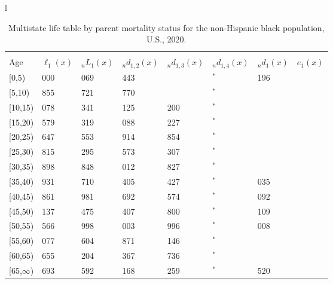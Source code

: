 \documentclass[
]{article}
\begin{document}
\begin{table}
\caption{\label{tab:table-nhblack}Multistate life table by parent mortality status for the non-Hispanic black population, U.S., 2020.}

\centering
\fontsize{9}{11}\selectfont
\begin{tabular}[t]{l}
\hline
\begin{tabular}{>{\raggedright\arraybackslash}p{.45in}>{\raggedleft\arraybackslash}p{.65in}>{\raggedleft\arraybackslash}p{.65in}>{\raggedleft\arraybackslash}p{.65in}>{\raggedleft\arraybackslash}p{.65in}>{\raggedleft\arraybackslash}p{.65in}>{\raggedleft\arraybackslash}p{.65in}>{\raggedleft\arraybackslash}p{.65in}}
\toprule
\multicolumn{1}{c}{ } & \multicolumn{7}{c}{(1) Lost neither} \\
\cmidrule(l{3pt}r{3pt}){2-8}
Age & $\ell_{1}(x)$ & ${}_nL_{1}(x)$ & ${}_nd_{1,2}(x)$ & ${}_nd_{1,3}(x)$ & ${}_nd_{1,4}(x)$ & ${}_nd_{1}(x)$ & $e_{1}(x)$\\
\midrule
{}[0,5) & 100 000 & 490 069 & 1 443 & 440 & 67$^{*}$ & 1 196 & 39\\
{}[5,10) & 96 855 & 477 721 & 1 770 & 889 & 17$^{*}$ & 101 & 35\\
{}[10,15) & 94 078 & 462 341 & 2 125 & 1 200 & 45$^{*}$ & 130 & 30\\
{}[15,20) & 90 579 & 440 319 & 3 088 & 1 227 & 97$^{*}$ & 520 & 25\\
{}[20,25) & 85 647 & 411 553 & 2 914 & 1 854 & 191$^{*}$ & 873 & 21\\
\addlinespace
{}[25,30) & 79 815 & 377 295 & 3 573 & 1 307 & 168$^{*}$ & 868 & 17\\
{}[30,35) & 73 898 & 337 848 & 5 012 & 1 827 & 169$^{*}$ & 959 & 13\\
{}[35,40) & 65 931 & 288 710 & 6 405 & 2 427 & 203$^{*}$ & 1 035 & 10\\
{}[40,45) & 55 861 & 233 981 & 5 692 & 2 574 & 367$^{*}$ & 1 092 & 7\\
{}[45,50) & 46 137 & 176 475 & 5 407 & 2 800 & 254$^{*}$ & 1 109 & 4\\
\addlinespace
{}[50,55) & 36 566 & 112 998 & 6 003 & 1 996 & 481$^{*}$ & 1 008 & 3\\
{}[55,60) & 27 077 & 60 604 & 4 871 & 2 146 & 595$^{*}$ & 810 & 1\\
{}[60,65) & 18 655 & 30 204 & 2 367 & 1 736 & 257$^{*}$ & 602 & 1\\
{}[65,$\infty$) & 13 693 & 24 592 & 2 168 & 2 259 & 281$^{*}$ & 1 520 & 0\\
\end{tabular}\\

\end{tabular}
\end{table}
\end{document}
